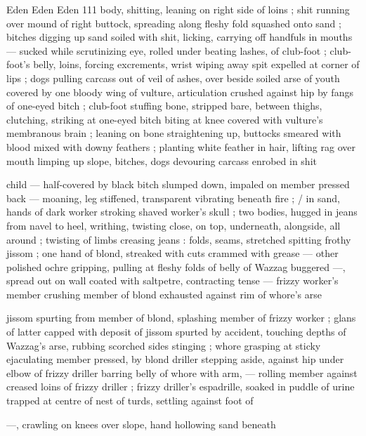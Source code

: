 Eden Eden Eden 111
body, shitting, leaning on right side of loins ; shit running over
mound of right buttock, spreading along fleshy fold squashed onto
sand ; bitches digging up sand soiled with shit, licking, carrying off
handfuls in mouths — sucked while scrutinizing eye, rolled under
beating lashes, of club-foot ; club-foot’s belly, loins, forcing
excrements, wrist wiping away spit expelled at corner of lips ; dogs
pulling carcass out of veil of ashes, over beside soiled arse of youth
covered by one bloody wing of vulture, articulation crushed against
hip by fangs of one-eyed bitch ; club-foot stuffing bone, stripped
bare, between thighs, clutching, striking at one-eyed bitch biting at
knee covered with vulture’s membranous brain ; leaning on bone
straightening up, buttocks smeared with blood mixed with downy
feathers ; planting white feather in hair, lifting rag over mouth
limping up slope, bitches, dogs devouring carcass enrobed in shit

child — half-covered by black bitch slumped down, impaled on
member pressed back — moaning, leg stiffened, transparent
vibrating beneath fire ; / in sand, hands of dark worker stroking
shaved worker's skull ; two bodies, hugged in jeans from navel to
heel, writhing, twisting close, on top, underneath, alongside, all
around ; twisting of limbs creasing jeans : folds, seams, stretched
spitting frothy jissom ; one hand of blond, streaked with cuts
crammed with grease — other polished ochre gripping, pulling at
fleshy folds of belly of Wazzag buggered —, spread out on wall
coated with saltpetre, contracting tense — frizzy worker's member
crushing member of blond exhausted against rim of whore’s arse

jissom spurting from member of blond, splashing member of frizzy
worker ; glans of latter capped with deposit of jissom spurted by
accident, touching depths of Wazzag's arse, rubbing scorched sides
stinging ; whore grasping at sticky ejaculating member pressed, by
blond driller stepping aside, against hip under elbow of frizzy driller
barring belly of whore with arm, — rolling member against creased
loins of frizzy driller ; frizzy driller's espadrille, soaked in puddle of
urine trapped at centre of nest of turds, settling against foot of

—, crawling on knees over slope, hand hollowing sand beneath

